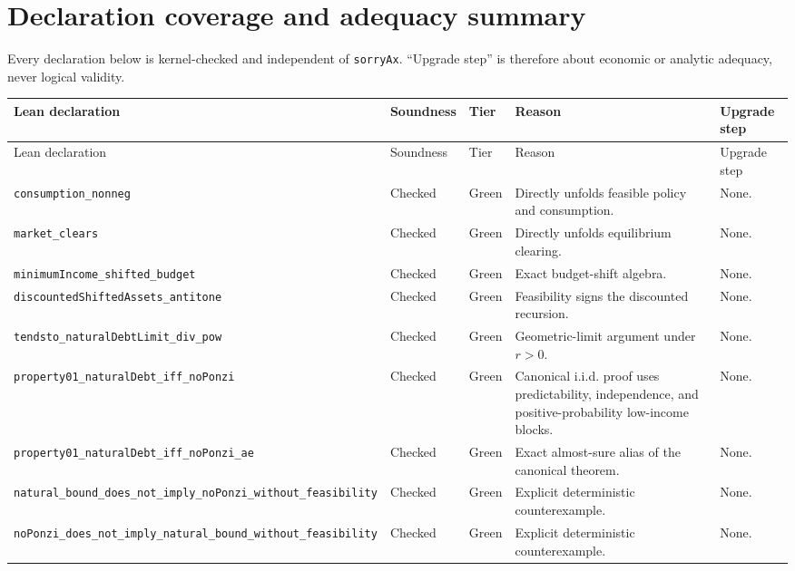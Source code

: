 \documentclass[11pt]{article}
\newcommand{\leanname}[1]{\nolinkurl{#1}}
\begin{document}
\section{Declaration coverage and adequacy summary}

Every declaration below is kernel-checked and independent of
\texttt{sorryAx}.  ``Upgrade step'' is therefore about economic or analytic
adequacy, never logical validity.

{\scriptsize
\setlength{\tabcolsep}{2.5pt}
\renewcommand{\arraystretch}{1.08}
\begin{longtable}{>{\raggedright\arraybackslash}p{}
                  >{\raggedright\arraybackslash}p{}
                  >{\raggedright\arraybackslash}p{}
                  >{\raggedright\arraybackslash}p{}
                  >{\raggedright\arraybackslash}p{}}
\toprule
Lean declaration & Soundness & Tier & Reason & Upgrade step \\
\midrule
\endfirsthead
\toprule Lean declaration & Soundness & Tier & Reason & Upgrade step \\
\midrule
\endhead
\leanname{consumption_nonneg} & Checked & Green & Directly unfolds feasible policy and consumption. & None. \\
\leanname{market_clears} & Checked & Green & Directly unfolds equilibrium clearing. & None. \\
\leanname{minimumIncome_shifted_budget} & Checked & Green & Exact budget-shift algebra. & None. \\
\leanname{discountedShiftedAssets_antitone} & Checked & Green & Feasibility signs the discounted recursion. & None. \\
\leanname{tendsto_naturalDebtLimit_div_pow} & Checked & Green & Geometric-limit argument under \(r>0\). & None. \\
\leanname{property01_naturalDebt_iff_noPonzi} & Checked & Green & Canonical i.i.d. proof uses predictability, independence, and positive-probability low-income blocks. & None. \\
\leanname{property01_naturalDebt_iff_noPonzi_ae} & Checked & Green & Exact almost-sure alias of the canonical theorem. & None. \\
\leanname{natural_bound_does_not_imply_noPonzi_without_feasibility} & Checked & Green & Explicit deterministic counterexample. & None. \\
\leanname{noPonzi_does_not_imply_natural_bound_without_feasibility} & Checked & Green & Explicit deterministic counterexample. & None. \\

\end{longtable}}
\end{document}
